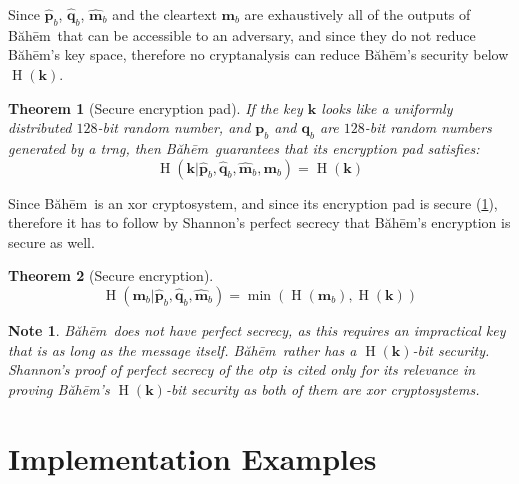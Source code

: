 \documentclass[twocolumn,hidelinks]{article}
\newcommand{\baheem}{Băhēm}
\DeclareMathOperator{\entropy}{H}
\newtheorem{theorem}{Theorem}[section]
\newtheorem{note}{Note}[section]
\begin{document}
Since $\mathbf{\hat p}_b$, $\mathbf{\hat q}_b$, $\mathbf{\hat m}_b$ and the
cleartext $\mathbf{m}_b$ are exhaustively all of the outputs of \baheem\
that can be accessible to an adversary, and since they do not reduce
\baheem's key space, therefore no cryptanalysis can reduce \baheem's
security below $\entropy(\mathbf{k})$.

\begin{theorem}[Secure encryption pad]
    If the key $\mathbf{k}$ looks like a uniformly distributed $128$-bit
    random number, and $\mathbf{p}_b$ and $\mathbf{q}_b$ are $128$-bit
    random numbers generated by a \gls{trng}, then \baheem\ guarantees that
    its encryption pad satisfies:
    \[
        \entropy(
            \mathbf{k}
            | \mathbf{\hat p}_b,
              \mathbf{\hat q}_b,
              \mathbf{\hat m}_b,
              \mathbf{m}_b
        )
        = \entropy(\mathbf{k})
    \]
    \label{thrm_baheem_perfect_encryption_pad}
\end{theorem}

Since \baheem\ is an \gls{xor} cryptosystem, and since its encryption pad
is secure (\cref{thrm_baheem_perfect_encryption_pad}), therefore it has to
follow by Shannon's perfect secrecy \cite{perfect_secrecy} that \baheem's
encryption is secure as well.

\begin{theorem}[Secure encryption]
    \[
        \entropy(
            \mathbf{m}_b
            | \mathbf{\hat p}_b,
              \mathbf{\hat q}_b,
              \mathbf{\hat m}_b
        )
        = \min(\entropy(\mathbf{m}_b), \entropy(\mathbf{k}))
    \]
    \label{thrm_baheem_secure}
\end{theorem}

\begin{note}
    \baheem\ does not have perfect secrecy, as this requires an impractical
    key that is as long as the message itself.  \baheem\ rather has a
    $\entropy(\mathbf{k})$-bit security.  Shannon's proof of perfect
    secrecy of the \gls{otp} is cited only for its relevance in proving
    \baheem's $\entropy(\mathbf{k})$-bit security as both of them are
    \gls{xor} cryptosystems.
\end{note}


\section{Implementation Examples}
\end{document}

